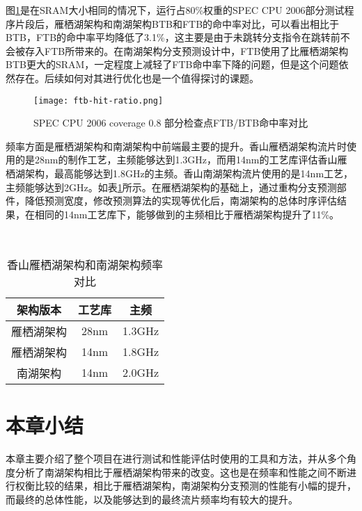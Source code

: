 图\ref{fig:figure63}是在SRAM大小相同的情况下，运行占80\%权重的SPEC CPU 2006部分测试程序片段后，雁栖湖架构和南湖架构BTB和FTB的命中率对比，可以看出相比于BTB，FTB的命中率平均降低了3.1\%，这主要是由于未跳转分支指令在跳转前不会被存入FTB所带来的。在南湖架构分支预测设计中，FTB使用了比雁栖湖架构BTB更大的SRAM，一定程度上减轻了FTB命中率下降的问题，但是这个问题依然存在。后续如何对其进行优化也是一个值得探讨的课题。



\begin{figure}[htb]
	\centering
	\setlength\tabcolsep{3pt}  %
	\vspace{5pt} %
	\texttt{[image: ftb-hit-ratio.png]}
	\caption{SPEC CPU 2006 coverage 0.8 部分检查点FTB/BTB命中率对比}
	\label{fig:figure63}
\end{figure}


频率方面是雁栖湖架构和南湖架构中前端最主要的提升。香山雁栖湖架构流片时使用的是28nm的制作工艺，主频能够达到1.3GHz，而用14nm的工艺库评估香山雁栖湖架构，最高能够达到1.8GHz的主频。香山南湖架构流片使用的是14nm工艺，主频能够达到2GHz。如表\ref{tb:table3}所示。在雁栖湖架构的基础上，通过重构分支预测部件，降低预测宽度，修改预测算法的实现等优化后，南湖架构的总体时序评估结果，在相同的14nm工艺库下，能够做到的主频相比于雁栖湖架构提升了11\%。

~\\

\begin{table}[!h]
	\caption{香山雁栖湖架构和南湖架构频率对比}
	\label{tb:table3}
	\centering
	\begin{tabular}{|c|c|c|}
		\hline
		架构版本   & 工艺库   & 主频   \\ \hline
		雁栖湖架构 & 28nm & 1.3GHz \\ \hline
		雁栖湖架构 & 14nm & 1.8GHz \\ \hline
		南湖架构 & 14nm & 2.0GHz \\ \hline
	\end{tabular}
\end{table}


\section{本章小结}

本章主要介绍了整个项目在进行测试和性能评估时使用的工具和方法，并从多个角度分析了南湖架构相比于雁栖湖架构带来的改变。这也是在频率和性能之间不断进行权衡比较的结果，相比于雁栖湖架构，南湖架构分支预测的性能有小幅的提升，而最终的总体性能，以及能够达到的最终流片频率均有较大的提升。